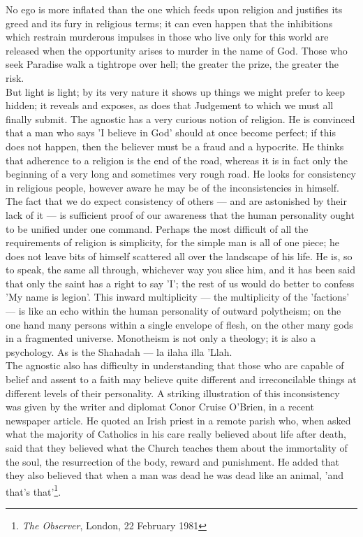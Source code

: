 \documentclass[11pt, b5paper, twoside]{book}
\begin{document}
No ego is more inflated than the one which feeds upon religion and justifies its greed and its fury 
in religious terms; it can even happen that the inhibitions which restrain murderous impulses in 
those who live only for this world are released when the opportunity arises to murder in the name of 
God. Those who seek Paradise walk a tightrope over hell; the greater the prize, the greater the risk. \\

But light is light; by its very nature it shows up things we might prefer to keep hidden; it reveals 
and exposes, as does that Judgement to which we must all finally submit. The agnostic has a very 
curious notion of religion. He is convinced that a man who says 'I believe in God' should at once 
become perfect; if this does not happen, then the believer must be a fraud and a hypocrite. He thinks 
that adherence to a religion is the end of the road, whereas it is in fact only the beginning of a 
very long and sometimes very rough road. He looks for consistency in religious people, however aware 
he may be of the inconsistencies in himself. \\

The fact that we do expect consistency of others --- and are astonished by their lack of it --- is 
sufficient proof of our awareness that the human personality ought to be unified under one command. 
Perhaps the most difficult of all the requirements of religion is simplicity, for the simple man is 
all of one piece; he does not leave bits of himself scattered all over the landscape of his life. He 
is, so to speak, the same all through, whichever way you slice him, and it has been said that only 
the saint has a right to say 'I'; the rest of us would do better to confess 'My name is legion'. This 
inward multiplicity --- the multiplicity of the 'factions' --- is like an echo within the human 
personality of outward polytheism; on the one hand many persons within a single envelope of flesh, on 
the other many gods in a fragmented universe. Monotheism is not only a theology; it is also a 
psychology. As is the Shahadah --- la ilaha illa 'Llah. \\

The agnostic also has difficulty in understanding that those who are capable of belief and assent to 
a faith may believe quite different and irreconcilable things at different levels of their 
personality. A striking illustration of this inconsistency was given by the writer and diplomat Conor 
Cruise O'Brien, in a recent newspaper article. He quoted an Irish priest in a remote parish who, when 
asked what the majority of Catholics in his care really believed about life after death, said that 
they believed what the Church teaches them about the immortality of the soul, the resurrection of the 
body, reward and punishment. He added that they also believed that when a man was dead he was dead 
like an animal, 'and that's that'\footnote{\emph{The Observer}, London, 22 February 1981}.
\end{document}
